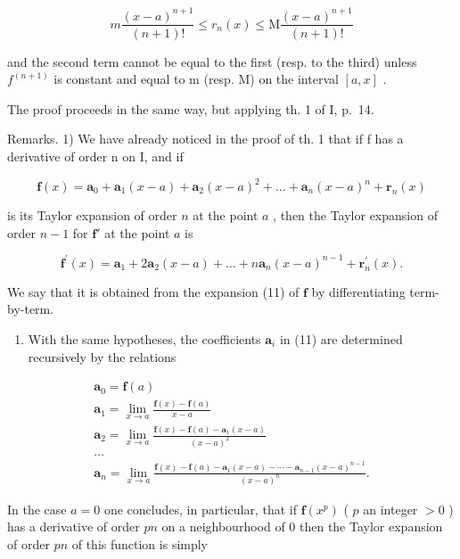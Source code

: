 \[
m \frac {(x - a) ^ {n + 1}}{(n + 1) !} \leqslant r _ {n} (x) \leqslant \mathrm{M} \frac {(x - a) ^ {n + 1}}{(n + 1) !}\tag{10}
\]

and the second term cannot be equal to the first (resp. to the third) unless \(f^{(n+1)}\) is constant and equal to m (resp. M) on the interval \([a, x]\) .

The proof proceeds in the same way, but applying th. 1 of I, p.~14.

Remarks. 1) We have already noticed in the proof of th. 1 that if f has a derivative of order n on I, and if

\[
\mathbf {f} (x) = \mathbf {a} _ {0} + \mathbf {a} _ {1} (x - a) + \mathbf {a} _ {2} (x - a) ^ {2} + \dots + \mathbf {a} _ {n} (x - a) ^ {n} + \mathbf {r} _ {n} (x)\tag{11}
\]

is its Taylor expansion of order \(n\) at the point \(a\) , then the Taylor expansion of order \(n - 1\) for \(\mathbf{f}'\) at the point \(a\) is

\[
\mathbf {f} ^ {\prime} (x) = \mathbf {a} _ {1} + 2 \mathbf {a} _ {2} (x - a) + \dots + n \mathbf {a} _ {n} (x - a) ^ {n - 1} + \mathbf {r} _ {n} ^ {\prime} (x).\tag{12}
\]

We say that it is obtained from the expansion (11) of \(\mathbf{f}\) by differentiating term-by-term.

\begin{enumerate}
\def\labelenumi{\arabic{enumi})}
\setcounter{enumi}{1}
\tightlist
\item
  With the same hypotheses, the coefficients \(\mathbf{a}_i\) in (11) are determined recursively by the relations
\end{enumerate}

\[
\begin{array}{l} \mathbf {a} _ {0} = \mathbf {f} (a) \\ \mathbf {a} _ {1} = \lim _ {x \to a} \frac {\mathbf {f} (x) - \mathbf {f} (a)}{x - a} \\ \mathbf {a} _ {2} = \lim _ {x \to a} \frac {\mathbf {f} (x) - \mathbf {f} (a) - \mathbf {a} _ {1} (x - a)}{(x - a) ^ {2}} \\ \dots \\ \mathbf {a} _ {n} = \lim _ {x \to a} \frac {\mathbf {f} (x) - \mathbf {f} (a) - \mathbf {a} _ {1} (x - a) - \cdots - \mathbf {a} _ {n - 1} (x - a) ^ {n - 1}}{(x - a) ^ {n}}. \end{array}
\]

In the case \(a = 0\) one concludes, in particular, that if \(\mathbf{f}(x^p)\) ( \(p\) an integer \(> 0\) ) has a derivative of order \(pn\) on a neighbourhood of 0 then the Taylor expansion of order \(pn\) of this function is simply

